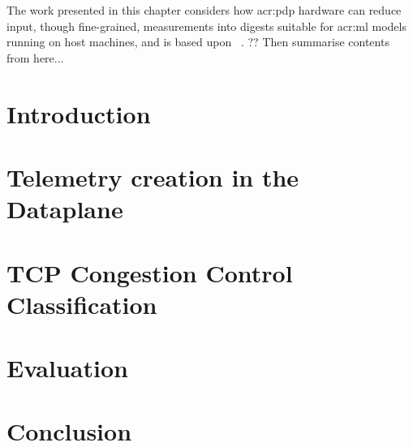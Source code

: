 The work presented in this chapter considers how \gls{acr:pdp} hardware can reduce input, though fine-grained, measurements into digests suitable for \gls{acr:ml} models running on host machines, and is based upon ~\parencite{DBLP:conf/globecom/SimpsonCP20}.
?? Then summarise contents from here...

\section{Introduction}\label{sec:introduction}


\section{Telemetry creation in the Dataplane}\label{sec:architecture}


\section{TCP Congestion Control Classification}\label{sec:tcpcc}


\section{Evaluation}\label{sec:evaluation}


% 

\section{Conclusion}\label{sec:conclustion}

